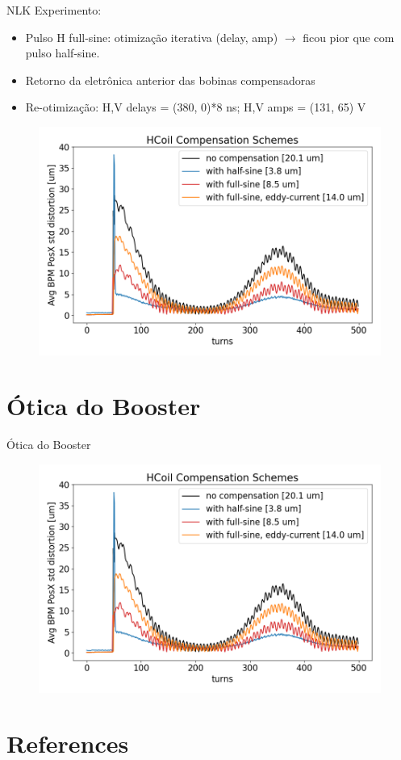 \documentclass{beamer}					  %
\begin{document}
\begin{frame}{NLK}
    Experimento:
    \begin{itemize}
    		\item Pulso H full-sine: otimização iterativa (delay, amp) $\rightarrow$ ficou pior que com pulso half-sine.
            \item Retorno da eletrônica anterior das bobinas compensadoras
            \item Re-otimização: H,V delays = (380, 0)*8 ns; H,V amps = (131, 65) V
    \end{itemize}
    \begin{figure}[H]
      \centering
          \includegraphics[width=1\textwidth]{2024-03-08/figures/hcoil-compensation-scheme.png}
          \label{fig:hcoil-scheme}
    \end{figure}
\end{frame}



\section{Ótica do Booster}

\begin{frame}{Ótica do Booster}
    \begin{figure}[H]
    		\centering
            \includegraphics[width=1.1\textwidth]{2024-03-08/figures/hcoil-compensation-scheme.png}
            \label{fig:bo-ramp}
    \end{figure}
\end{frame}



\section{References}
\end{document}
